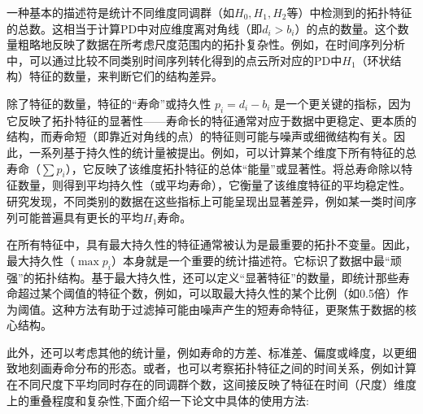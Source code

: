 一种基本的描述符是统计不同维度同调群（如$H_0, H_1, H_2$等）中检测到的拓扑特征的总数。这相当于计算PD中对应维度离对角线（即$d_i > b_i$）的点的数量。这个数量粗略地反映了数据在所考虑尺度范围内的拓扑复杂性。例如，在时间序列分析中，可以通过比较不同类别时间序列转化得到的点云所对应的PD中$H_1$（环状结构）特征的数量，来判断它们的结构差异。

除了特征的数量，特征的“寿命”或持久性 $p_i = d_i - b_i$ 是一个更关键的指标，因为它反映了拓扑特征的显著性——寿命长的特征通常对应于数据中更稳定、更本质的结构，而寿命短（即靠近对角线的点）的特征则可能与噪声或细微结构有关。因此，一系列基于持久性的统计量被提出。例如，可以计算某个维度下所有特征的总寿命（$\sum p_i$），它反映了该维度拓扑特征的总体“能量”或显著性。将总寿命除以特征数量，则得到平均持久性（或平均寿命），它衡量了该维度特征的平均稳定性。研究发现，不同类别的数据在这些指标上可能呈现出显著差异，例如某一类时间序列可能普遍具有更长的平均$H_1$寿命。

在所有特征中，具有最大持久性的特征通常被认为是最重要的拓扑不变量。因此，最大持久性（$\max p_i$）本身就是一个重要的统计描述符。它标识了数据中最“顽强”的拓扑结构。基于最大持久性，还可以定义“显著特征”的数量，即统计那些寿命超过某个阈值的特征个数，例如，可以取最大持久性的某个比例（如0.5倍）作为阈值。这种方法有助于过滤掉可能由噪声产生的短寿命特征，更聚焦于数据的核心结构。



此外，还可以考虑其他的统计量，例如寿命的方差、标准差、偏度或峰度，以更细致地刻画寿命分布的形态。或者，也可以考察拓扑特征之间的时间关系，例如计算在不同尺度下平均同时存在的同调群个数，这间接反映了特征在时间（尺度）维度上的重叠程度和复杂性,下面介绍一下论文中具体的使用方法:

